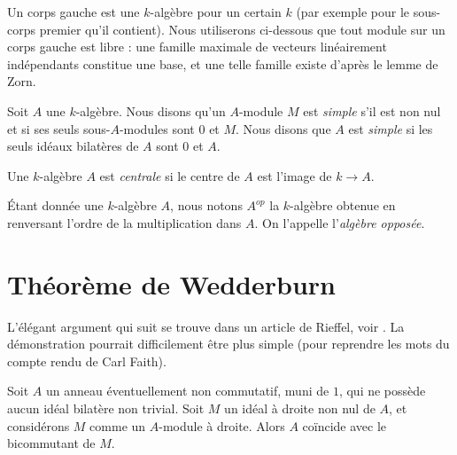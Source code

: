 \noindent
Un corps gauche est une $k$-algèbre pour un certain $k$ (par exemple pour le sous-corps premier
qu'il contient). Nous utiliserons ci-dessous que tout module sur un corps gauche
est libre : une famille maximale de vecteurs linéairement indépendants constitue une
base, et une telle famille existe d'après le lemme de Zorn.

\begin{definition}
\label{definition-simple}
Soit $A$ une $k$-algèbre.
Nous disons qu'un $A$-module $M$ est {\it simple} s'il est non nul et si
ses seuls sous-$A$-modules sont $0$ et $M$.
Nous disons que $A$ est {\it simple} si les seuls
idéaux bilatères de $A$ sont
$0$ et $A$.
\end{definition}

\begin{definition}
\label{definition-central}
Une $k$-algèbre $A$ est {\it centrale} si le centre de $A$ est l'image de
$k \to A$.
\end{definition}

\begin{definition}
\label{definition-opposite}
Étant donnée une $k$-algèbre $A$, nous notons $A^{op}$ la $k$-algèbre obtenue
en renversant l'ordre de la multiplication dans $A$. On l'appelle
l'{\it algèbre opposée}.
\end{definition}




\section{Théorème de Wedderburn}
\label{section-wedderburn}

\noindent
L'élégant argument qui suit se trouve dans un article de Rieffel, voir
\cite{Rieffel}. La démonstration pourrait difficilement être plus simple (pour reprendre
les mots du compte rendu de Carl Faith).

\begin{lemma}
\label{lemma-rieffel}
Soit $A$ un anneau éventuellement non commutatif, muni de $1$, qui ne possède aucun
idéal bilatère non trivial. Soit $M$ un idéal à droite non nul de $A$,
et considérons $M$ comme un $A$-module à droite. Alors $A$ coïncide avec le
bicommutant de $M$.
\end{lemma}

